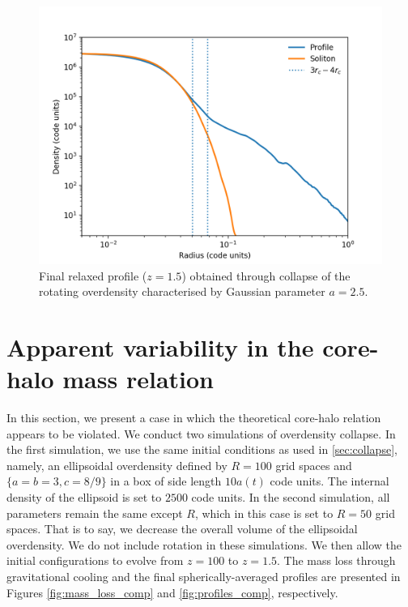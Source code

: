 \documentclass[a4paper,11pt]{article}
\begin{document}
\begin{figure}[!htb]
\centering
\includegraphics[trim={0 0 0 0},scale=0.6]{rot_complete.png}
\caption{Final relaxed profile ($z = 1.5$) obtained through collapse of the rotating overdensity characterised by Gaussian parameter $a = 2.5$.}\label{fig:rot_complete}
\end{figure}


\section{Apparent variability in the core-halo mass relation}\label{sec:core-halo}

In this section, we present a case in which the theoretical core-halo relation \cite{Schive:2014dra, Bar:2018acw} appears to be violated. We conduct two simulations of overdensity collapse. In the first simulation, we use the same initial conditions as used in \ref{sec:collapse}, namely, an ellipsoidal overdensity defined by $R = 100$ grid spaces and $\{a = b = 3, c = 8/9\}$ in a box of side length $10 a(t)$ code units. The internal density of the ellipsoid is set to $2500$ code units. In the second simulation, all parameters remain the same except $R$, which in this case is set to $R = 50$ grid spaces. That is to say, we decrease the overall volume of the ellipsoidal overdensity. We do not include rotation in these simulations. We then allow the initial configurations to evolve from $z = 100$ to $z = 1.5$. The mass loss through gravitational cooling and the final spherically-averaged profiles are presented in Figures \ref{fig:mass_loss_comp} and \ref{fig:profiles_comp}, respectively. 
\end{document}
